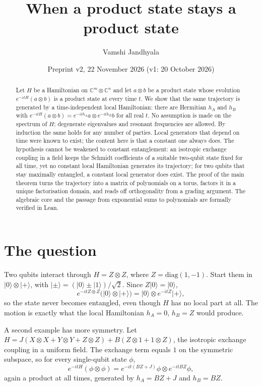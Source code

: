 \documentclass[11pt]{article}
\title{When a product state stays a product state}
\author{Vamshi Jandhyala}
\date{Preprint v2, 22 November 2026 (v1: 20 October 2026)}
\theoremstyle{remark}
\newcommand{\C}{\mathbb{C}}
\begin{document}
\maketitle
\vspace{-2em}

\begin{abstract}
Let $H$ be a Hamiltonian on $\C^m\otimes\C^n$ and let $a\otimes b$ be a product state whose
evolution $e^{-itH}(a\otimes b)$ is a product state at every time $t$. We show that the same
trajectory is generated by a time-independent local Hamiltonian: there are Hermitian $h_A$
and $h_B$ with $e^{-itH}(a\otimes b)=e^{-ith_A}a\otimes e^{-ith_B}b$ for all real $t$. No
assumption is made on the spectrum of $H$; degenerate eigenvalues and resonant frequencies
are allowed. By induction the same holds for any number of parties. Local generators that
depend on time were known to exist; the content here is that a constant one always does.
The hypothesis cannot be weakened to constant entanglement: an isotropic exchange coupling in a
field keeps the Schmidt coefficients of a suitable two-qubit state fixed for all time, yet no
constant local Hamiltonian generates its trajectory; for two qubits that stay maximally
entangled, a constant local generator does exist. The proof of the main theorem turns the
trajectory into a matrix of polynomials on a torus, factors it in a
unique factorisation domain, and reads off orthogonality from a grading argument. The
algebraic core and the passage from exponential sums to polynomials are formally verified
in Lean.
\end{abstract}

\section{The question}

Two qubits interact through $H=Z\otimes Z$, where $Z=\mathrm{diag}(1,-1)$. Start them in
$\lvert 0\rangle\otimes\lvert +\rangle$, with $\lvert\pm\rangle=(\lvert 0\rangle\pm\lvert
1\rangle)/\sqrt2$. Since $Z\lvert 0\rangle=\lvert 0\rangle$,
\[
e^{-itZ\otimes Z}\bigl(\lvert 0\rangle\otimes\lvert +\rangle\bigr)
=\lvert 0\rangle\otimes e^{-itZ}\lvert +\rangle ,
\]
so the state never becomes entangled, even though $H$ has no local part at all. The motion is
exactly what the local Hamiltonian $h_A=0$, $h_B=Z$ would produce.

A second example has more symmetry. Let $H=J(X\otimes X+Y\otimes Y+Z\otimes Z)+B(Z\otimes
1+1\otimes Z)$, the isotropic exchange coupling in a uniform field. The exchange term equals
$1$ on the symmetric subspace, so for every single-qubit state $\phi$,
\[
e^{-itH}(\phi\otimes\phi)=e^{-it(BZ+J)}\phi\otimes e^{-itBZ}\phi ,
\]
again a product at all times, generated by $h_A=BZ+J$ and $h_B=BZ$.
\end{document}
